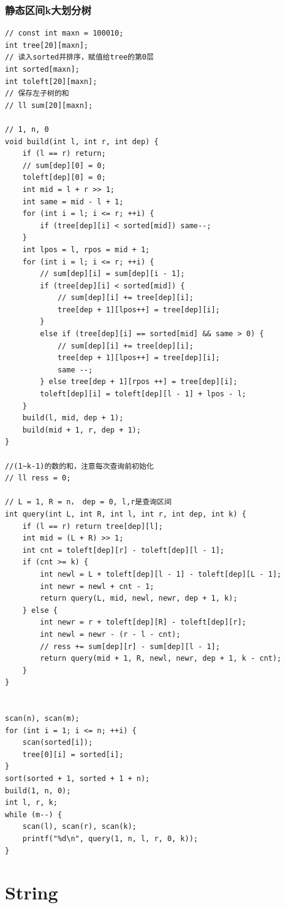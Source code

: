 \documentclass[twoside]{article}
\begin{document}
\subsubsection{静态区间k大划分树}
\begin{lstlisting}
// const int maxn = 100010;
int tree[20][maxn];
// 读入sorted并排序，赋值给tree的第0层
int sorted[maxn];
int toleft[20][maxn];
// 保存左子树的和
// ll sum[20][maxn];

// 1, n, 0
void build(int l, int r, int dep) {
    if (l == r) return;
    // sum[dep][0] = 0;
    toleft[dep][0] = 0;
    int mid = l + r >> 1;
    int same = mid - l + 1;
    for (int i = l; i <= r; ++i) {
        if (tree[dep][i] < sorted[mid]) same--;
    }
    int lpos = l, rpos = mid + 1;
    for (int i = l; i <= r; ++i) {
        // sum[dep][i] = sum[dep][i - 1];
        if (tree[dep][i] < sorted[mid]) {
            // sum[dep][i] += tree[dep][i];
            tree[dep + 1][lpos++] = tree[dep][i];
        }
        else if (tree[dep][i] == sorted[mid] && same > 0) {
            // sum[dep][i] += tree[dep][i];
            tree[dep + 1][lpos++] = tree[dep][i];
            same --;
        } else tree[dep + 1][rpos ++] = tree[dep][i];
        toleft[dep][i] = toleft[dep][l - 1] + lpos - l;
    }
    build(l, mid, dep + 1);
    build(mid + 1, r, dep + 1);
}

//(1~k-1)的数的和，注意每次查询前初始化
// ll ress = 0;

// L = 1, R = n， dep = 0, l,r是查询区间
int query(int L, int R, int l, int r, int dep, int k) {
    if (l == r) return tree[dep][l];
    int mid = (L + R) >> 1;
    int cnt = toleft[dep][r] - toleft[dep][l - 1];
    if (cnt >= k) {
        int newl = L + toleft[dep][l - 1] - toleft[dep][L - 1];
        int newr = newl + cnt - 1;
        return query(L, mid, newl, newr, dep + 1, k);
    } else {
        int newr = r + toleft[dep][R] - toleft[dep][r];
        int newl = newr - (r - l - cnt);
        // ress += sum[dep][r] - sum[dep][l - 1];
        return query(mid + 1, R, newl, newr, dep + 1, k - cnt);
    }
}


scan(n), scan(m);
for (int i = 1; i <= n; ++i) {
    scan(sorted[i]);
    tree[0][i] = sorted[i];
}
sort(sorted + 1, sorted + 1 + n);
build(1, n, 0);
int l, r, k;
while (m--) {
    scan(l), scan(r), scan(k);
    printf("%d\n", query(1, n, l, r, 0, k));
}\end{lstlisting}
\clearpage\section{String}
\end{document}
